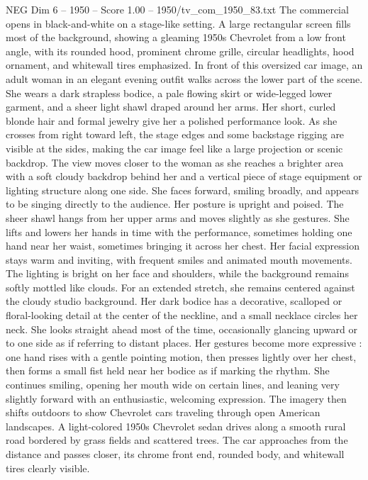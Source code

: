 \begin{textsample}{NEG Dim 6 – 1950 – Score 1.00 – 1950/tv\_com\_1950\_83.txt}  \label{ex:f6_neg_090}
The commercial opens in black-and-white on a stage-like setting.
A large rectangular screen fills most of the background, showing a gleaming 1950s Chevrolet from a low front angle, with its rounded hood, prominent chrome grille, circular headlights, hood ornament, and whitewall tires emphasized.
In front of this oversized car image, an adult woman in an elegant evening outfit walks across the lower part of the scene.
She wears a dark strapless bodice, a pale flowing skirt or wide-legged lower garment, and a sheer light shawl draped around her arms.
Her short, curled blonde hair and formal jewelry give her a polished performance look.
As she crosses from right toward left, the stage edges and some backstage rigging are visible at the sides, making the car image feel like a large projection or scenic backdrop.
The view moves closer to the woman as she reaches a brighter area with a soft cloudy backdrop behind her and a vertical piece of stage equipment or lighting structure along one side.
She faces forward, smiling broadly, and appears to be singing directly to the audience.
Her posture is upright and poised.
The sheer shawl hangs from her upper arms and moves slightly as she gestures.
She lifts and lowers her hands in time with the performance, sometimes holding one hand near her waist, sometimes bringing it across her chest.
Her facial expression stays warm and inviting, with frequent smiles and animated mouth movements.
The lighting is bright on her face and shoulders, while the background remains softly mottled like clouds.
For an extended stretch, she remains centered against the cloudy studio background.
Her dark bodice has a decorative, scalloped or floral-looking detail at the center of the neckline, and a small necklace circles her neck.
She looks straight ahead most of the time, occasionally glancing upward or to one side as if referring to distant places.
Her gestures become more expressive : one hand rises with a gentle pointing motion, then presses lightly over her chest, then forms a small fist held near her bodice as if marking the rhythm.
She continues smiling, opening her mouth wide on certain lines, and leaning very slightly forward with an enthusiastic, welcoming expression.
The imagery then shifts outdoors to show Chevrolet cars traveling through open American landscapes.
A light-colored 1950s Chevrolet sedan drives along a smooth rural road bordered by grass fields and scattered trees.
The car approaches from the distance and passes closer, its chrome front end, rounded body, and whitewall tires clearly visible.

\end{textsample}
